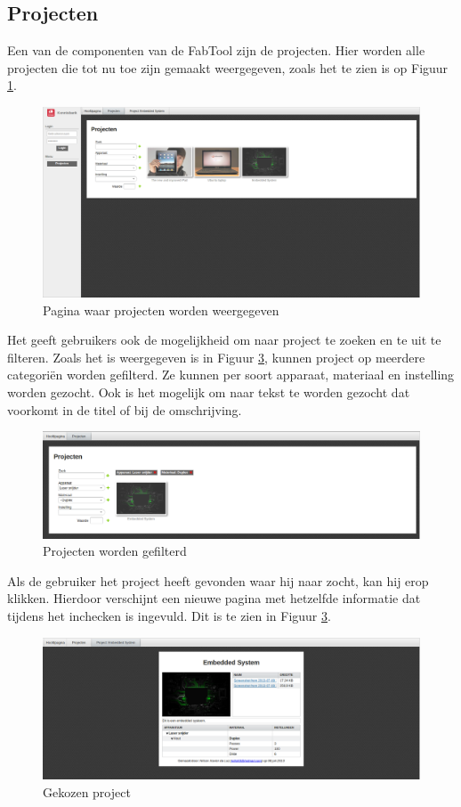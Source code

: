 \subsection{Projecten}

Een van de componenten van de FabTool zijn de projecten. Hier worden alle projecten die tot nu toe zijn gemaakt weergegeven, zoals het te zien is op Figuur \ref{fig:projects}.

\begin{figure}[Hh]
	\centering
	\includegraphics[width=1\textwidth]{Images/projects.png}
	\caption{Pagina waar projecten worden weergegeven}
	\label{fig:projects}
\end{figure}

Het geeft gebruikers ook de mogelijkheid om naar project te zoeken en te uit te filteren. Zoals het is weergegeven is in Figuur \ref{fig:filter-projects}, kunnen project op meerdere categori\"en worden gefilterd. Ze kunnen per soort apparaat, materiaal en instelling worden gezocht. Ook is het mogelijk om naar tekst te worden gezocht dat voorkomt in de titel of bij de omschrijving.

\begin{figure}[Hh]
	\centering
	\includegraphics[width=1\textwidth]{Images/filter-projects.png}
	\caption{Projecten worden gefilterd}
	\label{fig:filter-projects}
\end{figure}

Als de gebruiker het project heeft gevonden waar hij naar zocht, kan hij erop klikken. Hierdoor verschijnt een nieuwe pagina met hetzelfde informatie dat tijdens het inchecken is ingevuld. Dit is te zien in Figuur \ref{fig:filter-projects}.

\begin{figure}[H]
	\centering
	\includegraphics[width=1\textwidth]{Images/project.png}
	\caption{Gekozen project}
	\label{fig:filter-projects}
\end{figure}